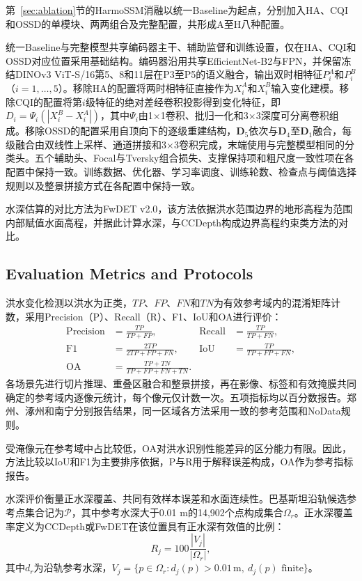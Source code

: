 \documentclass[authoryear,preprint,12pt]{elsarticle}
\begin{document}
第~\ref{sec:ablation}节的HarmoSSM消融以统一Baseline为起点，分别加入HA、CQI和OSSD的单模块、两两组合及完整配置，共形成A至H八种配置。

统一Baseline与完整模型共享编码器主干、辅助监督和训练设置，仅在HA、CQI和OSSD对应位置采用基础结构。编码器沿用共享EfficientNet-B2与FPN，并保留冻结DINOv3 ViT-S/16第5、8和11层在P3至P5的语义融合，输出双时相特征\(P_i^A\)和\(P_i^B\)（\(i=1,\dots,5\)）。移除HA的配置将两时相特征直接作为\(X_i^A\)和\(X_i^B\)输入变化建模。移除CQI的配置将第\(i\)级特征的绝对差经卷积投影得到变化特征，即\(D_i=\Psi_i(|X_i^B-X_i^A|)\)，其中\(\Psi_i\)由1×1卷积、批归一化和3×3深度可分离卷积组成。移除OSSD的配置采用自顶向下的逐级重建结构，\(\mathbf D_5\)依次与\(\mathbf D_4\)至\(\mathbf D_1\)融合，每级融合由双线性上采样、通道拼接和3×3卷积完成，末端使用与完整模型相同的分类头。五个辅助头、Focal与Tversky组合损失、支撑保持项和粗尺度一致性项在各配置中保持一致。训练数据、优化器、学习率调度、训练轮数、检查点与阈值选择规则以及整景拼接方式在各配置中保持一致。

水深估算的对比方法为FwDET v2.0\citep{cohen2019floodwater}，该方法依据洪水范围边界的地形高程为范围内部赋值水面高程，并据此计算水深，与CCDepth构成边界高程约束类方法的对比。

\subsection{Evaluation Metrics and Protocols}\label{sec:experiment_metrics}

洪水变化检测以洪水为正类，\(TP\)、\(FP\)、\(FN\)和\(TN\)为有效参考域内的混淆矩阵计数，采用Precision（P）、Recall（R）、F1、IoU和OA进行评价：
\begin{align}
 \mathrm{Precision}&=\frac{TP}{TP+FP}, & \mathrm{Recall}&=\frac{TP}{TP+FN},\label{eq:precision}\\
 \mathrm{F1}&=\frac{2TP}{2TP+FP+FN}, & \mathrm{IoU}&=\frac{TP}{TP+FP+FN},\label{eq:f1}\\
 \mathrm{OA}&=\frac{TP+TN}{TP+FP+FN+TN}.\label{eq:oa}
\end{align}
各场景先进行切片推理、重叠区融合和整景拼接，再在影像、标签和有效掩膜共同确定的参考域内逐像元统计，每个像元仅计数一次。五项指标均以百分数报告。郑州、涿州和南宁分别报告结果，同一区域各方法采用一致的参考范围和NoData规则。

受淹像元在参考域中占比较低，OA对洪水识别性能差异的区分能力有限。因此，方法比较以IoU和F1为主要排序依据，P与R用于解释误差构成，OA作为参考指标报告。

水深评价衡量正水深覆盖、共同有效样本误差和水面连续性。巴基斯坦沿轨候选参考点集合记为\(\mathcal P\)，其中参考水深大于0.01 m的14,902个点构成集合\(\Omega_r\)。正水深覆盖率定义为CCDepth或FwDET在该位置具有正水深有效值的比例：
\begin{equation}\label{eq:valid_depth_ratio}
 R_j=100\frac{|V_j|}{|\Omega_r|},
\end{equation}
其中\(d_r\)为沿轨参考水深，\(V_j=\{p\in\Omega_r:d_j(p)>0.01\,\mathrm m,\ d_j(p)\text{ finite}\}\)。
\end{document}
